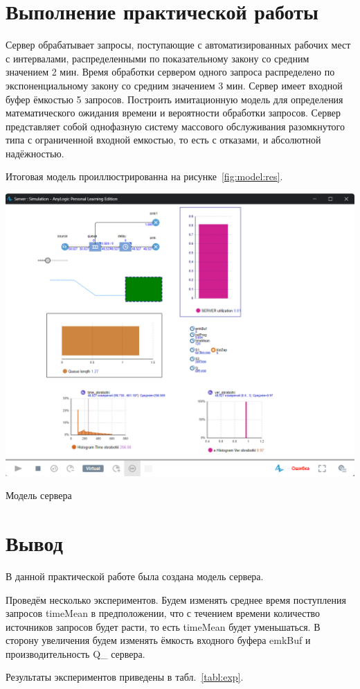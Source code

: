 \graphicspath{{./eighth/img/}} %

\section*{Выполнение практической работы}
Сервер обрабатывает запросы, поступающие с автоматизированных рабочих мест
с интервалами, распределенными по показательному закону со средним
значением 2 мин. Время обработки
сервером одного запроса распределено по экспоненциальному закону со
средним значением 3 мин. Сервер имеет входной буфер ёмкостью 5 запросов.
Построить имитационную модель для определения математического ожидания
времени и вероятности обработки запросов.
Сервер представляет собой однофазную систему массового обслуживания
разомкнутого типа с ограниченной входной емкостью,
то есть с отказами, и абсолютной надёжностью.\par
Итоговая модель проиллюстрированна на рисунке~\ref{fig:model:res}.

\begin{image}
	\includegraphics[width=1\textwidth]{2023-05-06_18-02-40}
	\caption{Модель сервера}
	\label{fig:model:res}
\end{image}

\clearpage

\section*{\LARGE Вывод}
В данной практической работе была создана модель сервера.\par
Проведём несколько экспериментов. Будем изменять среднее
время поступления запросов timeMean в предположении, что с течением времени
количество источников запросов будет расти, то
есть timeMean будет уменьшаться. В сторону увеличения будем
изменять ёмкость входного буфера emkBuf и производительность Q\_ сервера.\par
Результаты экспериментов приведены в табл.~\ref{tabl:exp}.

